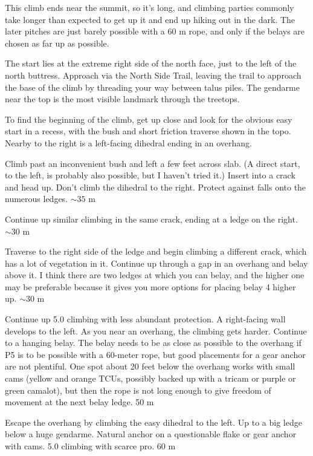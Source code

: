 \documentclass{tahquitz}
\begin{document}
This climb ends near the summit, so it's long, and climbing parties
commonly take longer than expected to get up it and end up hiking out
in the dark.  The later pitches are just barely possible with a 60 m
rope, and only if the belays are chosen as far up as possible.

The start lies at  the extreme right side of the north face, just to
the left of the north buttress. Approach via the North Side Trail,
leaving the trail to approach the base of the climb by threading your
way between talus piles. The gendarme near the top is the most
visible landmark through the treetops.

To find the beginning of the climb, get up close and look for the
obvious easy start in a recess, with the bush and short friction
traverse shown in the topo. Nearby to the right is a left-facing
dihedral ending in an overhang. 

 Climb past an inconvenient bush and left a few feet across slab.
(A direct start, to the left, is probably also possible, but I haven't tried it.)
Insert into a crack and head up. Don't climb the dihedral to the right. 
Protect against falls onto the numerous ledges.
$\sim 35$ m

 Continue up similar climbing in the same crack,
ending at a ledge on the right.  $\sim 30$ m

 Traverse to the right side of the ledge and begin climbing a
different crack, which has a lot of vegetation in it.
Continue up through a gap in an overhang and belay above it.
I think there are two ledges at which you can belay, and the higher one
may be preferable because it gives you more options for placing belay
4 higher up. $\sim 30$ m

 Continue up 5.0 climbing with less abundant protection.  A
right-facing wall develops to the left.  As you near an overhang, the
climbing gets harder.  Continue to a hanging belay. The belay needs to
be as close as possible to the overhang if P5 is to be possible with a
60-meter rope, but good placements for a gear anchor are not
plentiful. One spot about 20 feet below the overhang works with small
cams (yellow and orange TCUs, possibly backed up with a tricam or
purple or green camalot), but then the rope is not long enough to give
freedom of movement at the next belay ledge. 50 m

 Escape the overhang by climbing the easy dihedral to the left.
Up to a big ledge below a huge gendarme. Natural anchor on a questionable
flake or gear anchor with cams. 5.0 climbing with scarce pro.
60 m
\end{document}
